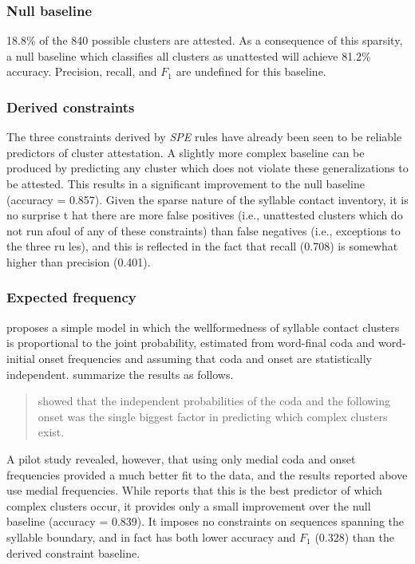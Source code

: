 \subsubsection{Null baseline}

18.8\% of the 840 possible clusters are attested. As a consequence of this sparsity, a null baseline which classifies all clusters as unattested will achieve 81.2\% accuracy. Precision, recall, and $F_1$ are undefined for this baseline.

\subsubsection{Derived constraints}

The three constraints derived by \emph{SPE} rules have already been seen to be reliable predictors of cluster attestation. A slightly more complex baseline can be produced by predicting any cluster which does not violate these generalizations to be attested. This results in a significant improvement to the null baseline (accuracy = 0.857). Given the sparse nature of the syllable contact inventory, it is no surprise t
hat there are more false positives (i.e., unattested clusters which do not run afoul
 of any of these constraints) than false negatives (i.e., exceptions to the three ru
les), and this is reflected in the fact that recall (0.708) is somewhat higher than
precision (0.401).

\subsubsection{Expected frequency}

\citet{Pierrehumbert1994} proposes a simple model in which the wellformedness of syllable contact clusters is proportional to the joint probability, estimated from word-final coda and word-initial onset frequencies and assuming that coda and onset are statistically independent. \citeauthor{Coleman1997} summarize the results as follows.

\begin{quote}
\citet{Pierrehumbert1994} showed that the independent probabilities of the coda and the following onset was the single biggest factor in predicting which complex clusters exist. \citep[50]{Coleman1997}
\end{quote}

\noindent A pilot study revealed, however, that using only medial coda and onset frequencies provided a much better fit to the data, and the results reported above use medial frequencies. While \citeauthor{Pierrehumbert1994} reports that this is the best predictor of which complex clusters occur, it provides only a small improvement over the null baseline (accuracy = 0.839). It imposes no constraints on sequences spanning the syllable boundary, and in fact has both lower accuracy and $F_1$ (0.328) than the derived constraint baseline.


